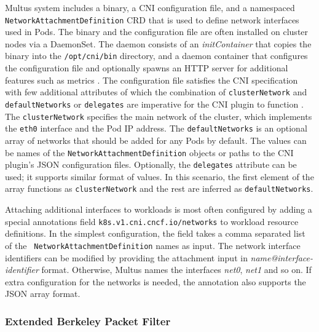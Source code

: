 \documentclass[english, 12pt, a4paper, sci, utf8, a-2b, online]{aaltothesis}
\begin{document}
Multus system includes a binary, a CNI configuration file, and a namespaced \texttt{NetworkAttachmentDefinition} CRD that is used to define network interfaces used in Pods. The binary and the configuration file are often installed on cluster nodes via a DaemonSet. The daemon consists of an \textit{initContainer} that copies the binary into the \texttt{/opt/cni/bin} directory, and a daemon container that configures the configuration file and optionally spawns an HTTP server for additional features such as metrics \cite{multus-cni}. The configuration file satisfies the CNI specification with few additional attributes of which the combination of \texttt{clusterNetwork} and \texttt{defaultNetworks} or \texttt{delegates} are imperative for the CNI plugin to function \cite{multus-cni-config}. The \texttt{clusterNetwork} specifies the main network of the cluster, which implements the \texttt{eth0} interface and the Pod IP address. The \texttt{defaultNetworks} is an optional array of networks that should be added for any Pods by default. The values can be names of the \texttt{NetworkAttachmentDefinition} objects or paths to the CNI plugin's JSON configuration files. Optionally, the \texttt{delegates} attribute can be used; it supports similar format of values. In this scenario, the first element of the array functions as \texttt{clusterNetwork} and the rest are inferred as \texttt{defaultNetworks}.


Attaching additional interfaces to workloads is most often configured by adding a special annotations field \texttt{k8s.v1.cni.cncf.io/networks} to workload resource definitions. In the simplest configuration, the field takes a comma separated list of the \texttt{ NetworkAttachmentDefinition} names as input. The network interface identifiers can be modified by providing the attachment input in \textit{name@interface-identifier} format. Otherwise, Multus names the interfaces \textit{net0}, \textit{net1} and so on. If extra configuration for the networks is needed, the annotation also supports the JSON array format.

\subsubsection{Extended Berkeley Packet Filter}
\end{document}
